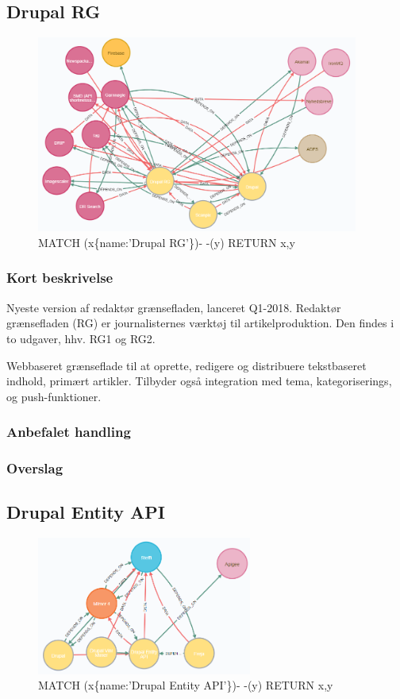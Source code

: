 \documentclass{article}
\begin{document}
\subsection{Drupal RG}
\begin{figure}[h]
\includegraphics[width=300pt]{DrupalRG.PNG}
\caption{MATCH (x\{name:'Drupal RG'\})- -(y) RETURN x,y}
\end{figure}
\subsubsection{Kort beskrivelse}
Nyeste version af redaktør grænsefladen, lanceret Q1-2018. Redaktør grænsefladen (RG) er journalisternes værktøj til artikelproduktion. Den findes i to udgaver, hhv. RG1 og RG2.	

Webbaseret grænseflade til at oprette, redigere og distribuere tekstbaseret indhold, primært artikler. Tilbyder også integration med tema, kategoriserings, og push-funktioner.
\subsubsection{Anbefalet handling}
\subsubsection{Overslag}


\subsection{Drupal Entity API}
\begin{figure}[h]
\includegraphics[width=200pt]{DrupalEntityAPI.PNG}
\caption{MATCH (x\{name:'Drupal Entity API'\})- -(y) RETURN x,y}
\end{figure}
\end{document}
